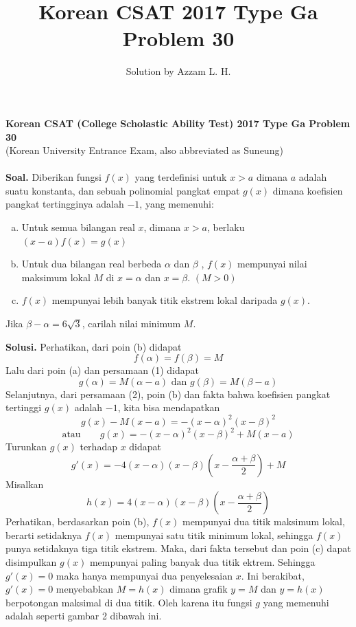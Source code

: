 \documentclass{article}
\title{Korean CSAT 2017 Type Ga Problem 30}
\author{Solution by Azzam L. H.}
\date{}
\begin{document}
	\maketitle 
	\begin{framed}
		\textbf{Korean CSAT (College Scholastic Ability Test) 2017 Type Ga Problem 30}\\ (Korean University Entrance Exam, also abbreviated as Suneung)\\
		\\
		\textbf{Soal. }Diberikan fungsi $f(x)$ yang  terdefinisi untuk $x>a$ dimana $a$ adalah suatu konstanta, dan sebuah polinomial pangkat empat $g(x)$ dimana koefisien pangkat tertingginya adalah $-1$, yang memenuhi:
		\begin{enumerate}[a)]
			\item Untuk semua bilangan real $x$, dimana $x>a$, berlaku $(x-a)f(x)=g(x)$
			
			\item
			Untuk dua bilangan real berbeda $\alpha$ dan $\beta$ , $f(x)$ mempunyai nilai\\ maksimum lokal $M$ di $x=\alpha$ dan $x=\beta$. $(M>0)$
			
			\item
			$f(x)$ mempunyai lebih banyak titik ekstrem lokal daripada $g(x)$. 
		\end{enumerate}
		Jika $\beta-\alpha=6 \sqrt{3}$, carilah nilai minimum $M$.
	\end{framed}
	
		\textbf{Solusi.} Perhatikan, dari poin (b) didapat \begin{equation}
		f(\alpha)=f(\beta)=M 
	\end{equation}    Lalu dari poin (a) dan persamaan (1) didapat 
	\begin{equation}
		g(\alpha)=M(\alpha-a) \text{ dan } g(\beta)=M(\beta-a)
	\end{equation}
	Selanjutnya, dari persamaan (2), poin (b) dan fakta bahwa koefisien pangkat tertinggi $g(x)$ adalah $-1$, kita bisa mendapatkan
	$$g(x)-M(x-a)=-(x-\alpha)^2(x-\beta)^2$$
	\begin{equation}
				\textrm{atau} \qquad g(x)=-(x-\alpha)^2(x-\beta)^2+M(x-a)
	\end{equation}
	Turunkan $g(x)$ terhadap $x$ didapat
	$$g'(x)=-4(x-\alpha)(x-\beta)\left( x-\frac{\alpha+\beta}{2} \right) +M$$
	Misalkan 
	\begin{equation}
		h(x)=4(x-\alpha)(x-\beta)\left( x-\frac{\alpha+\beta}{2} \right)
	\end{equation}
	Perhatikan, berdasarkan poin (b), $f(x)$ mempunyai dua titik maksimum lokal, berarti setidaknya $f(x)$ mempunyai satu titik minimum lokal, sehingga $f(x)$ punya setidaknya tiga titik ekstrem. Maka, dari fakta tersebut dan poin (c) dapat disimpulkan $g(x)$ mempunyai paling banyak dua titik ektrem. Sehingga $g'(x)=0$ maka hanya mempunyai dua penyelesaian $x$. Ini berakibat, $g'(x)=0$ menyebabkan $M=h(x)$ dimana grafik $y=M$ dan $y=h(x)$ berpotongan maksimal di dua titik. Oleh karena itu fungsi $g$ yang memenuhi adalah seperti gambar 2 dibawah ini. 
	
\end{document}
